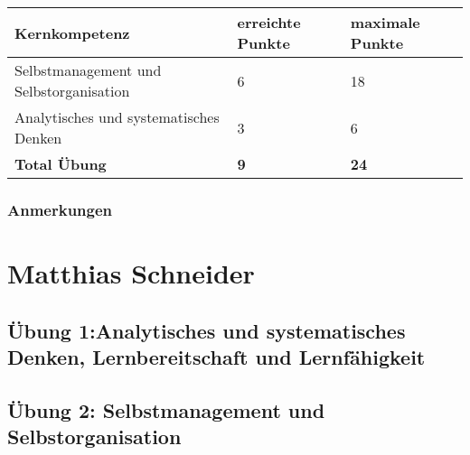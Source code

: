 \begin{center}
  \begin{tabular}{ | p{7cm} | p{3cm} | p{3cm} |}
   \hline
   \textbf{Kernkompetenz} & \textbf{erreichte Punkte} & \textbf{maximale Punkte} \\ \hline
   Selbstmanagement und Selbstorganisation & 6 & 18\\ \hline
   Analytisches und systematisches Denken & 3 & 6\\ \hline
   \textbf{Total Übung} & \textbf{9} & \textbf{24}\\ \hline
  \end{tabular}
\end{center}

\subsubsection{Anmerkungen}

\section{Matthias Schneider}
\subsection{Übung 1:Analytisches und systematisches Denken, Lernbereitschaft und Lernfähigkeit}

\subsection{Übung 2: Selbstmanagement und Selbstorganisation}
